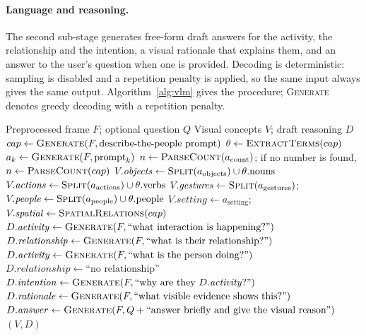\documentclass[12pt,a4paper,oneside]{report}
\begin{document}
\paragraph{Language and reasoning.} The second sub-stage generates free-form
draft answers for the activity, the relationship and the intention, a visual
rationale that explains them, and an answer to the user's question when one is
provided. Decoding is deterministic: sampling is disabled and a repetition
penalty is applied, so the same input always gives the same output.
Algorithm~\ref{alg:vlm} gives the procedure; \textsc{Generate} denotes greedy
decoding with a repetition penalty.

\begin{algorithm}[htbp]
\caption{Visual understanding and draft reasoning with SmolVLM}
\label{alg:vlm}
\begin{algorithmic}[1]
\Require Preprocessed frame $F$; optional question $Q$
\Ensure Visual concepts $V$; draft reasoning $D$
\State $cap \gets \textsc{Generate}(F, \text{describe-the-people prompt})$
\State $\theta \gets \textsc{ExtractTerms}(cap)$ 
  \State $a_k \gets \textsc{Generate}(F, \text{prompt}_k)$
\EndFor
\State $n \gets \textsc{ParseCount}(a_{\text{count}})$; if no number is found, $n \gets \textsc{ParseCount}(cap)$
\State $V.\mathit{objects} \gets \textsc{Split}(a_{\text{objects}}) \cup \theta.\text{nouns}$
\State $V.\mathit{actions} \gets \textsc{Split}(a_{\text{actions}}) \cup \theta.\text{verbs}$
\State $V.\mathit{gestures} \gets \textsc{Split}(a_{\text{gestures}})$;\; $V.\mathit{people} \gets \textsc{Split}(a_{\text{people}}) \cup \theta.\text{people}$
\State $V.\mathit{setting} \gets a_{\text{setting}}$;\; $V.\mathit{spatial} \gets \textsc{SpatialRelations}(cap)$
  \State $D.\mathit{activity} \gets \textsc{Generate}(F, \text{``what interaction is happening?''})$
  \State $D.\mathit{relationship} \gets \textsc{Generate}(F, \text{``what is their relationship?''})$
\Else
  \State $D.\mathit{activity} \gets \textsc{Generate}(F, \text{``what is the person doing?''})$
  \State $D.\mathit{relationship} \gets \text{``no relationship''}$
\EndIf
\State $D.\mathit{intention} \gets \textsc{Generate}(F, \text{``why are they } D.\mathit{activity}\text{?''})$
\State $D.\mathit{rationale} \gets \textsc{Generate}(F, \text{``what visible evidence shows this?''})$
  \State $D.\mathit{answer} \gets \textsc{Generate}(F, Q + \text{``answer briefly and give the visual reason''})$
\EndIf
\State \Return $(V, D)$
\end{algorithmic}
\end{algorithm}
\end{document}
